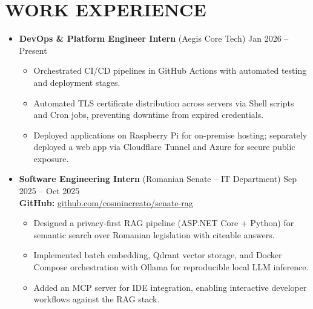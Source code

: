 \documentclass[10pt, letterpaper]{article}
\begin{document}
\section*{WORK EXPERIENCE}
\begin{itemize}
  \item \textbf{DevOps \& Platform Engineer Intern} (Aegis Core Tech) \hfill Jan 2026 -- Present
        \begin{itemize}
          \item Orchestrated CI/CD pipelines in GitHub Actions with automated testing and deployment stages.
          \item Automated TLS certificate distribution across servers via Shell scripts and Cron jobs, preventing downtime from expired credentials.
          \item Deployed applications on Raspberry Pi for on-premise hosting; separately deployed a web app via Cloudflare Tunnel and Azure for secure public exposure.
        \end{itemize}

  \item \textbf{Software Engineering Intern} (Romanian Senate -- IT Department) \hfill Sep 2025 -- Oct 2025 \\
        \textbf{GitHub:} \href{https://github.com/cosmincreato/senate-rag}{github.com/cosmincreato/senate-rag}
        \begin{itemize}
          \item Designed a privacy-first RAG pipeline (ASP.NET Core + Python) for semantic search over Romanian legislation with citeable answers.
          \item Implemented batch embedding, Qdrant vector storage, and Docker Compose orchestration with Ollama for reproducible local LLM inference.
          \item Added an MCP server for IDE integration, enabling interactive developer workflows against the RAG stack.
        \end{itemize}
\end{itemize}
\end{document}
